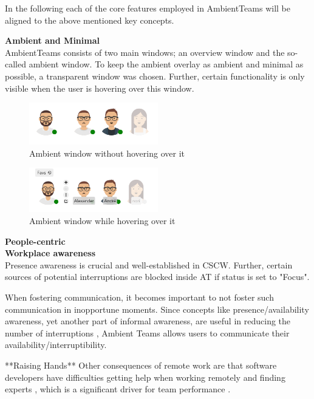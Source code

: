 In the following each of the core features employed in AmbientTeams will be aligned to the above mentioned key concepts.

\medskip\noindent\textbf{Ambient and Minimal} \\
AmbientTeams consists of two main windows; an overview window and the so-called ambient window. To keep the ambient overlay as ambient and minimal as possible, a transparent window was chosen. Further, certain functionality is only visible when the user is hovering over this window.

\begin{figure}[h]
    \label{fig:at_no_hover}
    \centering
    \includegraphics[width=0.5\textwidth]{./images/AT_no_hover.png}
    \caption{Ambient window without hovering over it }
\end{figure}

\begin{figure}[h]
    \label{fig:at_hover}
    \centering
    \includegraphics[width=0.5\textwidth]{./images/AT_hover.png}
    \caption{Ambient window while hovering over it }
\end{figure}


\medskip\noindent\textbf{People-centric} \\


\medskip\noindent\textbf{Workplace awareness} \\
Presence awareness is crucial and well-established in CSCW. Further, certain sources of potential interruptions are blocked inside AT if status is set to "Focus".

When fostering communication, it becomes important to not foster such communication in inopportune moments. Since concepts like presence/availability awareness, yet another part of informal awareness, are useful in reducing the number of interruptions \autocite{mark2005no}, Ambient Teams allows users to communicate their availability/interruptibility.


**Raising Hands**
Other consequences of remote work are that software developers have difficulties getting help when working remotely and finding experts \autocite{herbsleb2003empirical, espinosa2007team}, which is a significant driver for team performance \autocite{faraj2000coordinating}.


